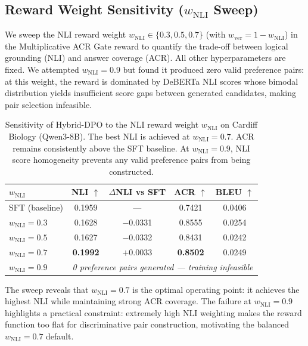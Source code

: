 \subsection{Reward Weight Sensitivity ($w_{\text{NLI}}$ Sweep)}
\label{sec:wnli_sweep}

We sweep the NLI reward weight $w_{\text{NLI}} \in \{0.3, 0.5, 0.7\}$ (with $w_{\text{ver}} = 1 - w_{\text{NLI}}$) in the Multiplicative ACR Gate reward to quantify the trade-off between logical grounding (NLI) and answer coverage (ACR). All other hyperparameters are fixed. We attempted $w_{\text{NLI}}=0.9$ but found it produced zero valid preference pairs: at this weight, the reward is dominated by DeBERTa NLI scores whose bimodal distribution yields insufficient score gaps between generated candidates, making pair selection infeasible.

\begin{table}[h]
\centering
\small
\begin{tabular}{l|c|c|c|c}
\toprule
$w_{\text{NLI}}$ & NLI $\uparrow$ & $\Delta$NLI vs SFT & ACR $\uparrow$ & BLEU $\uparrow$ \\
\midrule
SFT (baseline) & 0.1959 & --- & 0.7421 & 0.0406 \\
\midrule
$w_{\text{NLI}}=0.3$ & 0.1628 & $-$0.0331 & 0.8555 & 0.0254 \\
$w_{\text{NLI}}=0.5$ & 0.1627 & $-$0.0332 & 0.8431 & 0.0242 \\
$w_{\text{NLI}}=0.7$ & \textbf{0.1992} & $+$0.0033 & \textbf{0.8502} & 0.0249 \\
$w_{\text{NLI}}=0.9$ & \multicolumn{4}{c}{\textit{0 preference pairs generated --- training infeasible}} \\
\bottomrule
\end{tabular}
\caption{Sensitivity of Hybrid-DPO to the NLI reward weight $w_{\text{NLI}}$ on Cardiff Biology (Qwen3-8B). The best NLI is achieved at $w_{\text{NLI}}=0.7$. ACR remains consistently above the SFT baseline. At $w_{\text{NLI}}=0.9$, NLI score homogeneity prevents any valid preference pairs from being constructed.}
\label{tab:wnli_sweep}
\end{table}

The sweep reveals that $w_{\text{NLI}}=0.7$ is the optimal operating point: it achieves the highest NLI while maintaining strong ACR coverage. The failure at $w_{\text{NLI}}=0.9$ highlights a practical constraint: extremely high NLI weighting makes the reward function too flat for discriminative pair construction, motivating the balanced $w_{\text{NLI}}=0.7$ default.

